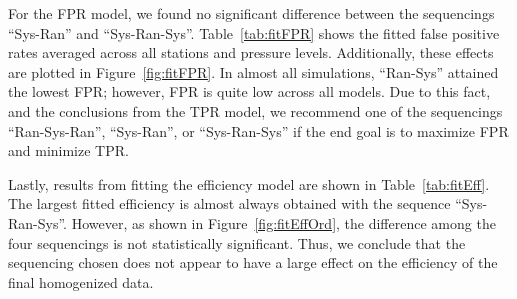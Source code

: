 \documentclass[12pt]{article}
\begin{document}
\begin{doublespacing}
For the FPR model, we found no significant difference between the sequencings ``Sys-Ran'' and ``Sys-Ran-Sys''.  Table~\ref{tab:fitFPR} shows the fitted false positive rates averaged across all stations and pressure levels.  Additionally, these effects are plotted in Figure~\ref{fig:fitFPR}.  In almost all simulations, ``Ran-Sys'' attained the lowest FPR; however, FPR is quite low across all models.  Due to this fact, and the conclusions from the TPR model, we recommend one of the sequencings ``Ran-Sys-Ran'', ``Sys-Ran'', or ``Sys-Ran-Sys'' if the end goal is to maximize FPR and minimize TPR.

Lastly, results from fitting the efficiency model are shown in Table~\ref{tab:fitEff}.  The largest fitted efficiency is almost always obtained with the sequence ``Sys-Ran-Sys''.  However, as shown in Figure~\ref{fig:fitEffOrd}, the difference among the four sequencings is not statistically significant.  Thus, we conclude that the sequencing chosen does not appear to have a large effect on the efficiency of the final homogenized data.




\end{doublespacing}
\end{document}
